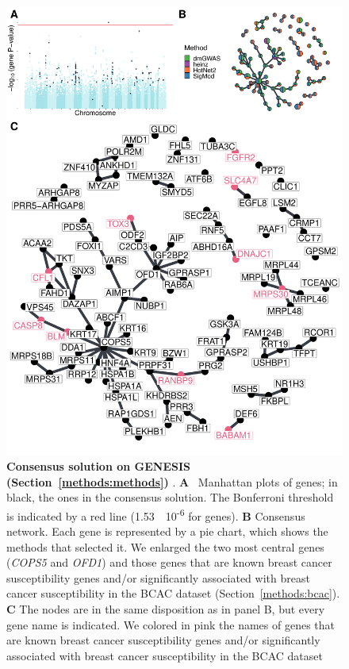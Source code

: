 \documentclass[10pt,letterpaper]{article}
\begin{document}
\begin{figure}[!ht]
  \centering
  \includegraphics[width=.8\linewidth]{./figures/figure_3.pdf}
  \caption{ {\bf Consensus solution on GENESIS (Section~\ref{methods:methods}) }. \textbf{A} ~Manhattan plots of genes; in black, the ones in the consensus solution. The Bonferroni threshold is indicated by a red line (1.53~\texttimes{}~10\textsuperscript{-6} for genes). \textbf{B} Consensus network. Each gene is represented by a pie chart, which shows the methods that selected it. We enlarged the two most central genes (\emph{COPS5} and \emph{OFD1}) and those genes that are known breast cancer susceptibility genes and/or significantly associated with breast cancer susceptibility in the BCAC dataset (Section~\ref{methods:bcac}). \textbf{C} The nodes are in the same disposition as in panel B, but every gene name is indicated. We colored in pink the names of genes that are known breast cancer susceptibility genes and/or significantly associated with breast cancer susceptibility in the BCAC dataset}
  \label{fig:consensus}
\end{figure}
\end{document}
